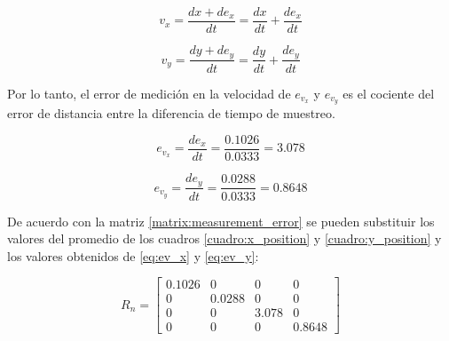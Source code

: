\begin{equation}
v_x = \frac{dx + de_x}{dt} 
    = \frac{dx}{dt} + \frac{de_x}{dt}
\end{equation}

\begin{equation}
v_y = \frac{dy + de_y}{dt}
    = \frac{dy}{dt} + \frac{de_y}{dt}
\end{equation}

	Por lo tanto, el error de medición en la velocidad de $e_{v_x}$ y $e_{v_y}$ es el cociente del error de distancia entre la diferencia de tiempo de muestreo. 

\begin{equation}
e_{v_x} = \frac{de_x}{dt}
		= \frac{0.1026}{0.0333}
		= 3.078 
\label{eq:ev_x}
\end{equation}

\begin{equation}
e_{v_y} = \frac{de_y}{dt}
		= \frac{0.0288}{0.0333}
		= 0.8648
\label{eq:ev_y}
\end{equation}

	De acuerdo con la matriz \ref{matrix:measurement_error} se pueden substituir los valores del promedio de los cuadros \ref{cuadro:x_position} y  \ref{cuadro:y_position} y los valores obtenidos de \ref{eq:ev_x} y \ref{eq:ev_y}:
	
\begin{equation}
R_n = 
\begin{bmatrix}
0.1026 & 0 & 0 & 0\\ 
0 & 0.0288 & 0 & 0\\ 
0 & 0 & 3.078 & 0\\ 
0 & 0 & 0 & 0.8648
\end{bmatrix}
\end{equation}

